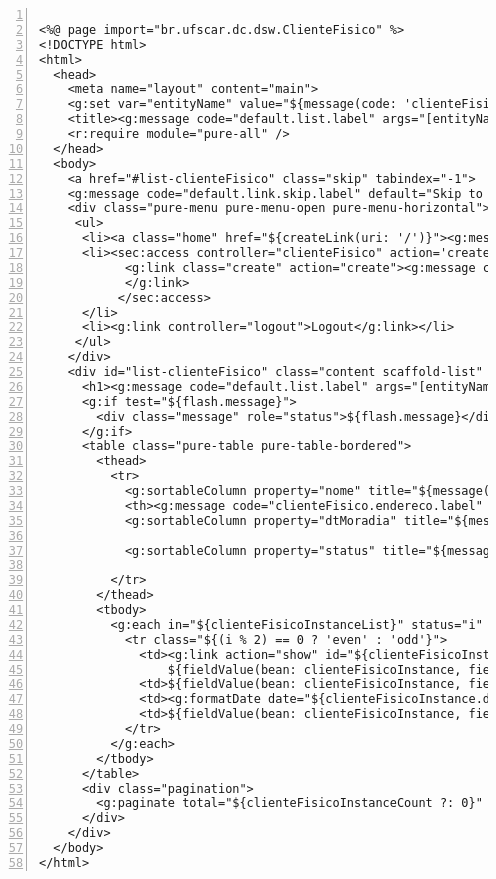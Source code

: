 \begin{lstlisting}[numbers=left,  caption=Visão  {\bf  clienteFisico/index.gsp},
    frame=trBL, float=htbp, label=codClienteFisicoIndex2] 

<%@ page import="br.ufscar.dc.dsw.ClienteFisico" %>
<!DOCTYPE html>
<html>
  <head>
    <meta name="layout" content="main">
    <g:set var="entityName" value="${message(code: 'clienteFisico.label', default: 'ClienteFisico')}" />
    <title><g:message code="default.list.label" args="[entityName]" /></title>
    <r:require module="pure-all" />
  </head>
  <body>
    <a href="#list-clienteFisico" class="skip" tabindex="-1">
    <g:message code="default.link.skip.label" default="Skip to content&hellip;"/></a>
    <div class="pure-menu pure-menu-open pure-menu-horizontal">
     <ul>
      <li><a class="home" href="${createLink(uri: '/')}"><g:message code="default.home.label"/></a></li>
      <li><sec:access controller="clienteFisico" action='create'>
            <g:link class="create" action="create"><g:message code="default.new.label" args="[entityName]" />
            </g:link>
           </sec:access>
      </li>                            
      <li><g:link controller="logout">Logout</g:link></li>
     </ul>
    </div>
    <div id="list-clienteFisico" class="content scaffold-list" role="main">
      <h1><g:message code="default.list.label" args="[entityName]" /></h1>
      <g:if test="${flash.message}">
        <div class="message" role="status">${flash.message}</div>
      </g:if>
      <table class="pure-table pure-table-bordered">
        <thead>
          <tr>
            <g:sortableColumn property="nome" title="${message(code:'clienteFisico.nome.label',default:'Nome')}" />
            <th><g:message code="clienteFisico.endereco.label" default="Endereco" /></th>
            <g:sortableColumn property="dtMoradia" title="${message(code: 'clienteFisico.dtMoradia.label', 
                                                                    default: 'Dt Moradia')}" />
            <g:sortableColumn property="status" title="${message(code: 'clienteFisico.status.label', 
                                                                 default: 'Status')}" />
          </tr>
        </thead>
        <tbody>
          <g:each in="${clienteFisicoInstanceList}" status="i" var="clienteFisicoInstance">
            <tr class="${(i % 2) == 0 ? 'even' : 'odd'}">
              <td><g:link action="show" id="${clienteFisicoInstance.id}">
                  ${fieldValue(bean: clienteFisicoInstance, field: "nome")}</g:link></td>
              <td>${fieldValue(bean: clienteFisicoInstance, field: "endereco")}</td>
              <td><g:formatDate date="${clienteFisicoInstance.dtMoradia}" /></td>
              <td>${fieldValue(bean: clienteFisicoInstance, field: "status")}</td>
            </tr>
          </g:each>
        </tbody>
      </table>
      <div class="pagination">
        <g:paginate total="${clienteFisicoInstanceCount ?: 0}" />
      </div>
    </div>
  </body>
</html>
\end{lstlisting}

